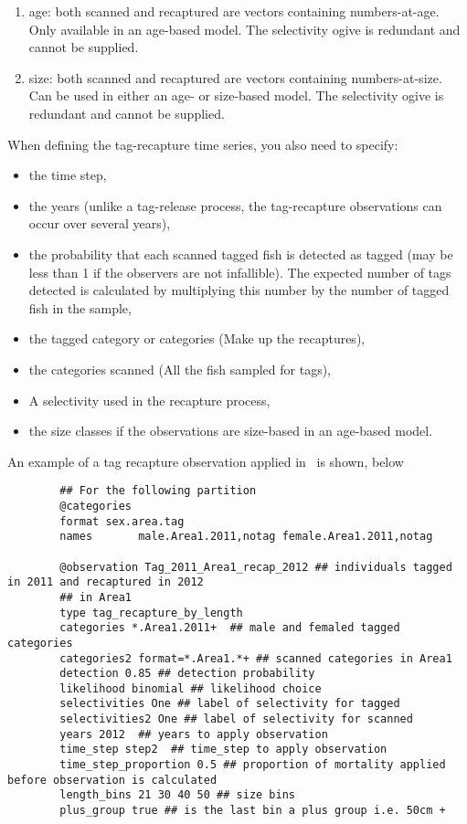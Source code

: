 {{{{\begin{enumerate}
	\item age: both scanned and recaptured are vectors containing numbers-at-age. Only available in an age-based model. The selectivity ogive is redundant and cannot be supplied.
	\item size: both scanned and recaptured are vectors containing numbers-at-size. Can be used in either an age- or size-based model. The selectivity ogive is redundant and cannot be supplied.
\end{enumerate}
When defining the tag-recapture time series, you also need to specify:
\begin{itemize}
	\item the time step,
	\item the years (unlike a tag-release process, the tag-recapture observations can occur over several years),
	\item the probability that each scanned tagged fish is detected as tagged (may be less than 1 if the observers are not infallible). The expected number of tags detected is calculated by multiplying this number by the number of tagged fish in the sample,
	\item the tagged category or categories (Make up the recaptures),
	\item the categories scanned (All the fish sampled for tags),
	\item A selectivity used in the recapture process,
	\item the size classes if the observations are size-based in an age-based model.
\end{itemize}


An example of a tag recapture observation applied in \CNAME\ is shown, below
{\small{\begin{verbatim}
		## For the following partition
		@categories
		format sex.area.tag
		names  		male.Area1.2011,notag female.Area1.2011,notag
		
		@observation Tag_2011_Area1_recap_2012 ## individuals tagged in 2011 and recaptured in 2012
		## in Area1
		type tag_recapture_by_length
		categories *.Area1.2011+  ## male and femaled tagged categories
		categories2 format=*.Area1.*+ ## scanned categories in Area1
		detection 0.85 ## detection probability
		likelihood binomial ## likelihood choice
		selectivities One ## label of selectivity for tagged
		selectivities2 One ## label of selectivity for scanned
		years 2012  ## years to apply observation
		time_step step2  ## time_step to apply observation	
		time_step_proportion 0.5 ## proportion of mortality applied before observation is calculated 
		length_bins 21 30 40 50	## size bins
		plus_group true ## is the last bin a plus group i.e. 50cm +
		

\end{verbatim}}}}}}}
